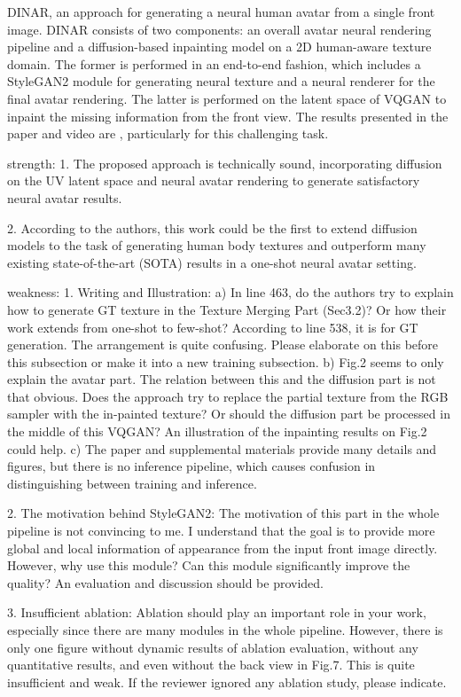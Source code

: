 DINAR, an approach for generating a neural human avatar from a single front image. DINAR consists of two components: an overall avatar neural rendering pipeline and a diffusion-based inpainting model on a 2D human-aware texture domain. The former is performed in an end-to-end fashion, which includes a StyleGAN2 module for generating neural texture and a neural renderer for the final avatar rendering. The latter is performed on the latent space of VQGAN to inpaint the missing information from the front view. The results presented in the paper and video are , particularly for this challenging task.

strength:
1. The proposed approach is technically sound, incorporating diffusion on the UV latent space and neural avatar rendering to generate satisfactory neural avatar results.

2. According to the authors, this work could be the first to extend diffusion models to the task of generating human body textures and outperform many existing state-of-the-art (SOTA) results in a one-shot neural avatar setting.

weakness:
1. Writing and Illustration: a) In line 463, do the authors try to explain how to generate GT texture in the Texture Merging Part (Sec3.2)? Or how their work extends from one-shot to few-shot? According to line 538, it is for GT generation. The arrangement is quite confusing. Please elaborate on this before this subsection or make it into a new training subsection. b) Fig.2 seems to only explain the avatar part. The relation between this and the diffusion part is not that obvious. Does the approach try to replace the partial texture from the RGB sampler with the in-painted texture? Or should the diffusion part be processed in the middle of this VQGAN? An illustration of the inpainting results on Fig.2 could help. c) The paper and supplemental materials provide many details and figures, but there is no inference pipeline, which causes confusion in distinguishing between training and inference.

2. The motivation behind StyleGAN2: The motivation of this part in the whole pipeline is not convincing to me. I understand that the goal is to provide more global and local information of appearance from the input front image directly. However, why use this module? Can this module significantly improve the quality? An evaluation and discussion should be provided.

3. Insufficient ablation: Ablation should play an important role in your work, especially since there are many modules in the whole pipeline. However, there is only one figure without dynamic results of ablation evaluation, without any quantitative results, and even without the back view in Fig.7. This is quite insufficient and weak. If the reviewer ignored any ablation study, please indicate.

